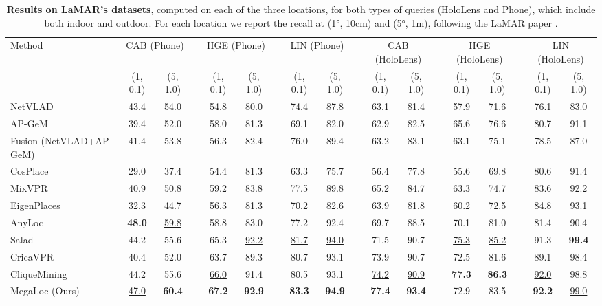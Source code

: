 \begin{table*}
\begin{center}
\begin{adjustbox}{width=0.99\linewidth}
\centering
\begin{tabular}{lccccccccccccccccc}
\toprule
\multicolumn{1}{l}{\multirow{2}{*}{Method}} &
\multicolumn{2}{c}{CAB (Phone)} & &
\multicolumn{2}{c}{HGE (Phone)} & &
\multicolumn{2}{c}{LIN (Phone)} & &
\multicolumn{2}{c}{CAB (HoloLens)} & &
\multicolumn{2}{c}{HGE (HoloLens)} & &
\multicolumn{2}{c}{LIN (HoloLens)} \\
\cline{2-3} \cline{5-6} \cline{8-9} \cline{11-12} \cline{14-15} \cline{17-18}
& (1, 0.1) & (5, 1.0) & & (1, 0.1) & (5, 1.0) & & (1, 0.1) & (5, 1.0) & & (1, 0.1) & (5, 1.0) & & (1, 0.1) & (5, 1.0) & & (1, 0.1) & (5, 1.0) \\
\midrule
NetVLAD               & 43.4 & 54.0 && 54.8 & 80.0 && 74.4 & 87.8 && 63.1 & 81.4 && 57.9 & 71.6 && 76.1 & 83.0 \\
AP-GeM                & 39.4 & 52.0 && 58.0 & 81.3 && 69.1 & 82.0 && 62.9 & 82.5 && 65.6 & 76.6 && 80.7 & 91.1 \\
Fusion (NetVLAD+AP-GeM)&41.4 & 53.8 && 56.3 & 82.4 && 76.0 & 89.4 && 63.2 & 83.1 && 63.1 & 75.1 && 78.5 & 87.0 \\
CosPlace              & 29.0 & 37.4 && 54.4 & 81.3 && 63.3 & 75.7 && 56.4 & 77.8 && 55.6 & 69.8 && 80.6 & 91.4 \\
MixVPR                & 40.9 & 50.8 && 59.2 & 83.8 && 77.5 & 89.8 && 65.2 & 84.7 && 63.3 & 74.7 && 83.6 & 92.2 \\
EigenPlaces           & 32.3 & 44.7 && 56.3 & 81.3 && 70.2 & 82.6 && 63.9 & 81.8 && 60.2 & 72.5 && 84.8 & 93.1 \\
AnyLoc                &\textbf{48.0}&\underline{59.8}&& 58.8 & 83.0 && 77.2 & 92.4 && 69.7 & 88.5 && 70.1 & 81.0 && 81.4 & 90.4 \\
Salad                 & 44.2 & 55.6 &&65.3&\underline{92.2}&&\underline{81.7}&\underline{94.0}&& 71.5 & 90.7 &&\underline{75.3}&\underline{85.2}&& 91.3 &\textbf{99.4}\\
CricaVPR              & 40.4 & 52.0 && 63.7 & 89.3 && 80.7 & 93.1 && 73.9 & 90.7 && 72.5 & 81.6 && 89.1 & 98.4 \\
CliqueMining          & 44.2 & 55.6 &&\underline{66.0}& 91.4 && 80.5 & 93.1 &&\underline{74.2}&\underline{90.9}&&\textbf{77.3}&\textbf{86.3}&&\underline{92.0}&98.8 \\
MegaLoc (Ours)        &\underline{47.0}&\textbf{60.4}&&\textbf{67.2}&\textbf{92.9}&&\textbf{83.3}&\textbf{94.9}&&\textbf{77.4}&\textbf{93.4}&&72.9&83.5&&\textbf{92.2}&\underline{99.0}\\
\bottomrule
\end{tabular}
\end{adjustbox}
\end{center}
\caption{\textbf{Results on LaMAR's datasets}, computed on each of the three locations, for both types of queries (HoloLens and Phone), which include both indoor and outdoor. For each location we report the recall at (1°, 10cm) and (5°, 1m), following the LaMAR paper \cite{sarlin2022lamar}.}
\label{tab:lamar}
\end{table*}

